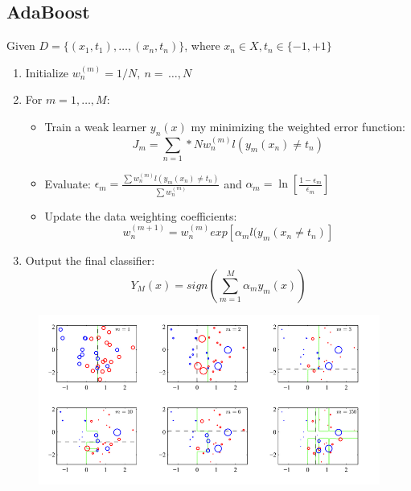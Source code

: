 \subsection{AdaBoost}
Given $D = \{(x_{1}, t_{1}), \dots, (x_{n}, t_{n})\}$, where $x_{n} \in X, t_{n} \in \{-1, +1\}$
\begin{enumerate}
    \item Initialize $w_{n}^{(m)}= 1/N,\ n=\, \dots, N$
    \item For $m=1, \dots, M$:
    \begin{itemize}
        \item Train a weak learner $y_{n}(x)$ my minimizing the weighted error function:
        \begin{equation}
            J_{m} = \sum_{n=1}*{N}w_{n}^{(m)}l(y_{m}(x_{n}) \neq t_{n})
        \end{equation}
        \item Evaluate: $\epsilon_{m} = \frac{\sum w_{n}^{(m)}l(y_{m}(x_{n}) \neq t_{n})}{\sum w_{n}^{(m)}}$ and $\alpha_{m}=\ln [\frac{1 - \epsilon_{m}}{\epsilon_{m}}]$
        \item Update the data weighting coefficients:
        \begin{equation}
            w_{n}^{(m+1)} = w_{n}^{(m)}exp[\alpha_{m}l(y_{m}(x_{n}\neq t_{n})]
        \end{equation}
    \end{itemize}
    \item Output the final classifier:
    \begin{equation}
        Y_{M}(x) = sign(\sum_{m=1}^{M}\alpha_{m}y_{m}(x))
    \end{equation}
\end{enumerate}
\begin{figure}[H]
    \centering
    \includegraphics[width=15cm]{images/boosting/adaboost.png}
    \label{fig:adboost}
\end{figure}

